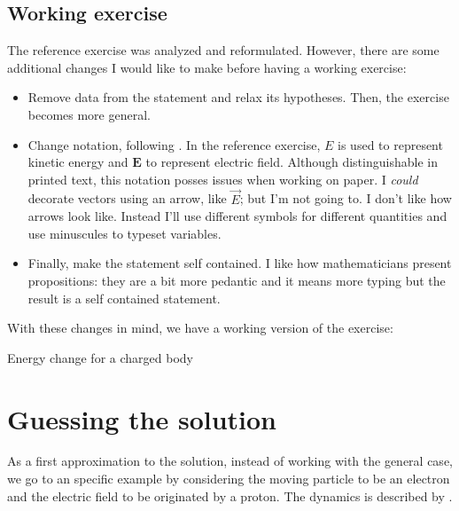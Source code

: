 \subsection{Working exercise}\label{sec:workingexercise}
%
The reference exercise was analyzed and reformulated. However, there are some additional changes I would like to make before having a working exercise:
%
\begin{itemize}
%
\item Remove data from the statement and relax its hypotheses. Then, the exercise becomes more general.
%
\item Change notation, following \cite{denker:notation}. In the reference exercise, $E$ is used to represent kinetic energy and $\mathbf{E}$ to represent electric field. Although distinguishable in printed text, this notation posses issues when working on paper. I \emph{could} decorate vectors using an arrow, like $\vec{E}$; but I'm not going to. I don't like how arrows look like. Instead I'll use different symbols for different quantities and use minuscules to typeset variables.
%
\item Finally, make the statement self contained. I like how mathematicians present propositions: they are a bit more pedantic and it means more typing but the result is a self contained statement.
%
\end{itemize}

With these changes in mind, we have a working version of the exercise:
%
\begin{description}
%
\item[Energy change for a charged body] 
%
\end{description}
%

%
\section{Guessing the solution}
%
As a first approximation to the solution, instead of working with the general case, we go to an specific example by considering the moving particle to be an electron and the electric field to be originated by a proton. The dynamics is described by .

